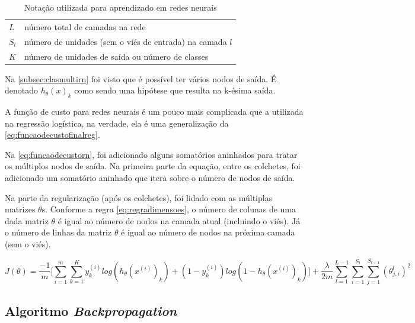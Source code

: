\begin{table}[!htb]
\begin{center}
\caption{Notação utilizada para aprendizado em redes neurais} \label{tab:tabfuncaocustorn}
\begin{tabular}{m{2cm}m{12.0cm}}
  \toprule
  $L$ 	& número total de camadas na rede\\
  $S_l$	& número de unidades (sem o viés de entrada) na camada $l$ \\
  $K$   & número de unidades de saída ou número de classes  \\
  \bottomrule
\end{tabular}
\end{center}
\end{table}

Na \autoref{subsec:clasmultirn} foi visto que é possível ter vários nodos de saída. É denotado $h_{\theta}(x)_k$ como sendo uma hipótese que resulta na k-ésima saída.

A função de custo para redes neurais é um pouco mais complicada que a utilizada na regressão logística, na verdade, ela é uma generalização da \autoref{eq:funcaodecustofinalreg}. 

Na \autoref{eq:funcaodecustorn}, foi adicionado alguns somatórios aninhados para tratar os múltiplos nodos de saída. Na primeira parte da equação, entre os colchetes, foi adicionado um somatório aninhado que itera sobre o número de nodos de saída.

Na parte da regularização (após os colchetes), foi lidado com as múltiplas matrizes $\theta$s. Conforme a regra \ref{eq:regradimensoes}, o número de colunas de uma dada matriz $\theta$ é igual ao número de nodos na camada atual (incluindo o viés). Já o número de linhas da matriz $\theta$ é igual ao número de nodos na próxima camada (sem o viés). 

\begin{equation}\label{eq:funcaodecustorn}
J(\theta) = \frac{-1}{m}\Big[ \sum\limits_{i=1}^m \sum\limits_{k=1}^K y_k^{(i)}log(h_{\theta}(x^{(i)})_k) + (1 - y_k^{(i)})log(1 - h_{\theta}(x^{(i)})_k) \Big] +
\frac{\lambda}{2m} 
\sum\limits_{l=1}^{L-1}
\sum\limits_{i=1}^{S_l}
\sum\limits_{j=1}^{S_{l+1}} (\theta_{j,i}^{l})^2
\end{equation}


\subsection{Algoritmo \textit{Backpropagation}}

